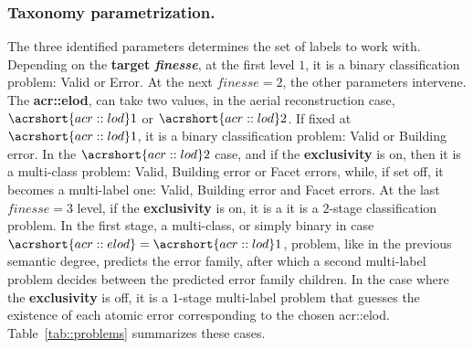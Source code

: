 \documentclass[runningheads]{llncs}
\begin{document}
\subsubsection{Taxonomy parametrization.}
The three identified parameters determines the set of labels to work with. Depending on the \textbf{target \textit{finesse}}, at the first level $1$, it is a binary classification problem: Valid or Error. At the next $\textit{finesse}=2$, the other parameters intervene. The \textbf{\acrshort{acr::elod}}, can take two values, in the aerial reconstruction case, $\acrshort{acr::lod}1$ or $\acrshort{acr::lod}2$. If fixed at $\acrshort{acr::lod}1$, it is a binary classification problem: Valid or Building error. In the $\acrshort{acr::lod}2$ case, and if the \textbf{exclusivity} is on, then it is a multi-class problem: Valid, Building error or Facet errors, while, if set off, it becomes a multi-label one: Valid, Building error and Facet errors. At the last $\textit{finesse}=3$ level, if the \textbf{exclusivity} is on, it is a it is a $2$-stage classification problem. In the first stage, a multi-class, or simply binary in case $\acrshort{acr::elod} = \acrshort{acr::lod}1$, problem, like in the previous semantic degree, predicts the error family, after which a second multi-label problem decides between the predicted error family children. In the case where the \textbf{exclusivity} is off, it is a $1$-stage multi-label problem that guesses the existence of each atomic error corresponding to the chosen \acrshort{acr::elod}. Table~\ref{tab::problems} summarizes these cases.
\end{document}
